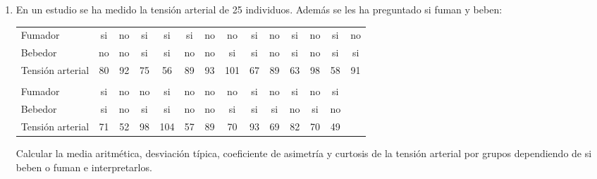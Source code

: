 \begin{enumerate}[leftmargin=*]
\item En un estudio se ha medido la tensión arterial de 25 individuos. Además se les ha preguntado si fuman y beben:
\begin{center}
\begin{tabular}{lccccccccccccc}
\hline
Fumador  & si & no & si & si & si & no & no & si & no & si & no & si & no \\
Bebedor & no & no & si & si & no & no & si & si & no & si & no & si & si \\
Tensión arterial & 80 & 92 & 75 & 56 & 89 & 93 & 101 & 67 & 89 & 63 & 98 & 58 & 91 \\
\hline
\\
\hline
Fumador  & si & no & no & si & no & no & no & si & no & si & no & si \\
Bebedor & si & no & si & si & no & no & si & si & si & no & si & no \\
Tensión arterial & 71 & 52 & 98 & 104 & 57 & 89 & 70 & 93 & 69 & 82 & 70 & 49 \\
\hline
\end{tabular}
\end{center}

Calcular la media aritmética, desviación típica, coeficiente de asimetría y curtosis de la tensión arterial por
grupos dependiendo de si beben o fuman e interpretarlos.
\end{enumerate}

